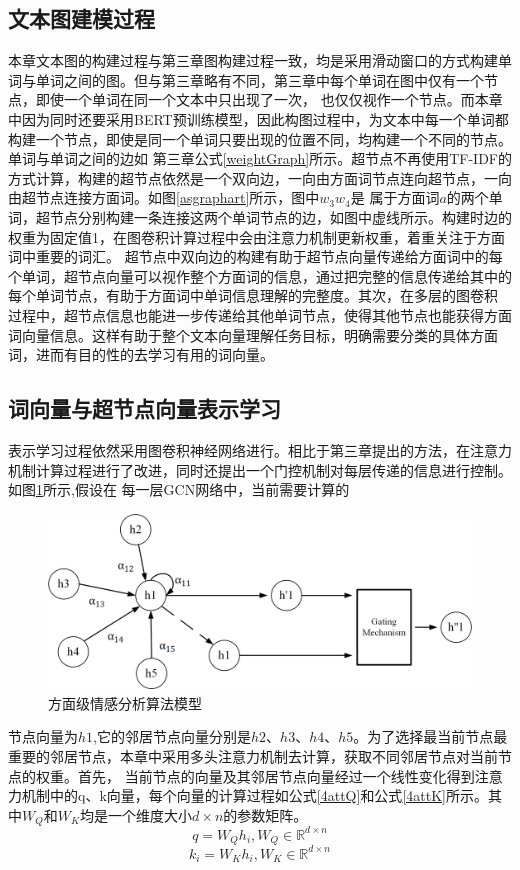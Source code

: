 \subsection{文本图建模过程}
本章文本图的构建过程与第三章图构建过程一致，均是采用滑动窗口的方式构建单词与单词之间的图。但与第三章略有不同，第三章中每个单词在图中仅有一个节点，即使一个单词在同一个文本中只出现了一次，
也仅仅视作一个节点。而本章中因为同时还要采用BERT预训练模型，因此构图过程中，为文本中每一个单词都构建一个节点，即使是同一个单词只要出现的位置不同，均构建一个不同的节点。单词与单词之间的边如
第三章公式\ref{weightGraph}所示。超节点不再使用TF-IDF的方式计算，构建的超节点依然是一个双向边，一向由方面词节点连向超节点，一向由超节点连接方面词。如图\ref{asgraphart}所示，图中$w_3$$w_4$是
属于方面词$a$的两个单词，超节点分别构建一条连接这两个单词节点的边，如图中虚线所示。构建时边的权重为固定值1，在图卷积计算过程中会由注意力机制更新权重，着重关注于方面词中重要的词汇。
超节点中双向边的构建有助于超节点向量传递给方面词中的每个单词，超节点向量可以视作整个方面词的信息，通过把完整的信息传递给其中的每个单词节点，有助于方面词中单词信息理解的完整度。其次，在多层的图卷积
过程中，超节点信息也能进一步传递给其他单词节点，使得其他节点也能获得方面词向量信息。这样有助于整个文本向量理解任务目标，明确需要分类的具体方面词，进而有目的性的去学习有用的词向量。


\subsection{词向量与超节点向量表示学习}
表示学习过程依然采用图卷积神经网络进行。相比于第三章提出的方法，在注意力机制计算过程进行了改进，同时还提出一个门控机制对每层传递的信息进行控制。如图\ref{attgcn}所示,假设在
每一层GCN网络中，当前需要计算的
\begin{figure}[htb]
	\setlength{\belowcaptionskip}{0pt}
	\centering
	\includegraphics[width=1\textwidth]{pic/attgcn.png}
	\caption{方面级情感分析算法模型}
	\label{attgcn}
\end{figure}
节点向量为$h1$,它的邻居节点向量分别是$h2$、$h3$、$h4$、$h5$。为了选择最当前节点最重要的邻居节点，本章中采用多头注意力机制去计算，获取不同邻居节点对当前节点的权重。首先，
当前节点的向量及其邻居节点向量经过一个线性变化得到注意力机制中的q、k向量，每个向量的计算过程如公式\ref{4attQ}和公式\ref{4attK}所示。其中$W_Q$和$W_K$均是一个维度大小$d\times n$的参数矩阵。
\begin{equation}\label{4attQ}
    q = W_Qh_i, W_Q\in \mathbb{R}^{d\times n}
\end{equation}
\begin{equation}\label{4attK}
    k_i = W_Kh_i, W_K\in \mathbb{R}^{d\times n}
\end{equation}

